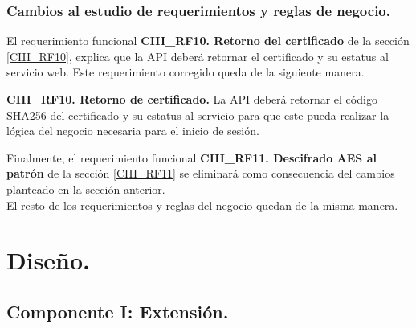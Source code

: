 \documentclass[12pt, a4paper, titlepage]{report}
\begin{document}
	        \subsection{Cambios al estudio de requerimientos y reglas de negocio.}
                El requerimiento funcional \textbf{CIII\_RF10. Retorno del certificado} de la sección \ref{CIII_RF10}, explica que la API deberá retornar el certificado y su estatus al servicio web. Este requerimiento corregido queda de la siguiente manera.\\
                
                {
                \setlength{\parindent}{0cm}
                
                \textbf{CIII\_RF10. Retorno de certificado.} La API deberá retornar el código SHA256 del certificado y su estatus al servicio para que este pueda realizar la lógica del negocio necesaria para el inicio de sesión.\\
                \label{P2_CIII_RF10}
                }
                
                Finalmente, el requerimiento funcional \textbf{CIII\_RF11. Descifrado AES al patrón} de la sección \ref{CIII_RF11} se eliminará como consecuencia del cambios planteado en la sección anterior.\\ 
                
                El resto de los requerimientos y reglas del negocio quedan de la misma manera.
    \chapter{\textcolor{azulescom}{Diseño.}}
			
		\section{Componente I: Extensión.}
		
\end{document}
